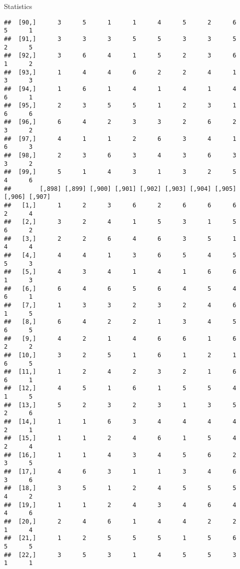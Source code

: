 \documentclass[
  ignorenonframetext,
]{beamer}
\begin{document}
\begin{frame}[fragile]{Statistics}
\begin{verbatim}
##  [90,]      3      5      1      1      4      5      2      6      5      1
##  [91,]      3      3      3      5      5      3      3      5      2      5
##  [92,]      3      6      4      1      5      2      3      6      1      2
##  [93,]      1      4      4      6      2      2      4      1      3      3
##  [94,]      1      6      1      4      1      4      1      4      6      1
##  [95,]      2      3      5      5      1      2      3      1      6      6
##  [96,]      6      4      2      3      3      2      6      2      3      2
##  [97,]      4      1      1      2      6      3      4      1      6      3
##  [98,]      2      3      6      3      4      3      6      3      3      2
##  [99,]      5      1      4      3      1      3      2      5      4      6
##        [,898] [,899] [,900] [,901] [,902] [,903] [,904] [,905] [,906] [,907]
##   [1,]      1      2      3      6      2      6      6      6      2      4
##   [2,]      3      2      4      1      5      3      1      5      6      2
##   [3,]      2      2      6      4      6      3      5      1      4      4
##   [4,]      4      4      1      3      6      5      4      5      5      3
##   [5,]      4      3      4      1      4      1      6      6      1      3
##   [6,]      6      4      6      5      6      4      5      4      6      1
##   [7,]      1      3      3      2      3      2      4      6      1      5
##   [8,]      6      4      2      2      1      3      4      5      6      5
##   [9,]      4      2      1      4      6      6      1      6      2      2
##  [10,]      3      2      5      1      6      1      2      1      6      5
##  [11,]      1      2      4      2      3      2      1      6      6      1
##  [12,]      4      5      1      6      1      5      5      4      1      5
##  [13,]      5      2      3      2      3      1      3      5      2      6
##  [14,]      1      1      6      3      4      4      4      4      2      1
##  [15,]      1      1      2      4      6      1      5      4      2      4
##  [16,]      1      1      4      3      4      5      6      2      3      5
##  [17,]      4      6      3      1      1      3      4      6      3      6
##  [18,]      3      5      1      2      4      5      5      5      4      2
##  [19,]      1      1      2      4      3      4      6      4      4      6
##  [20,]      2      4      6      1      4      4      2      2      1      4
##  [21,]      1      2      5      5      5      1      5      6      5      5
##  [22,]      3      5      3      1      4      5      5      3      1      1

\end{verbatim}
\end{frame}
\end{document}
